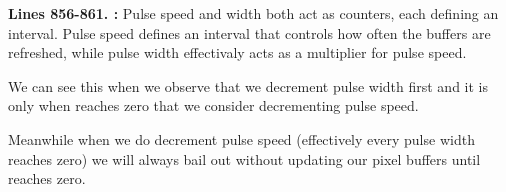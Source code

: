 \textbf{Lines 856-861. :} 
Pulse speed and width both act as counters, each defining an interval. Pulse speed
defines an interval that controls how often the buffers are refreshed, while 
pulse width effectivaly acts as a multiplier for pulse speed.

We can see this when we observe that we decrement pulse width first and it is only
when  reaches zero that we consider decrementing pulse speed.

Meanwhile when we do decrement pulse speed (effectively every pulse width reaches zero)
we will always bail out without updating our pixel buffers until 
reaches zero.

\clearpage

